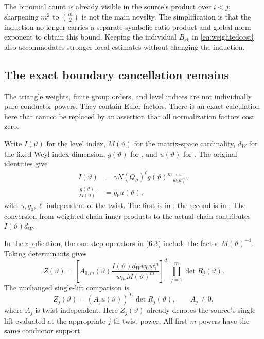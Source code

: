 The binomial count is already visible in the source's product over \(i<j\);
sharpening \(m^2\) to \(\binom m2\) is not the main novelty.
The simplification is that the induction no longer carries a separate
symbolic ratio product and global norm exponent to obtain this bound.
Keeping the individual \(B_{rk}\) in \eqref{eq:weightedcost} also
accommodates stronger local estimates without changing the induction.

\subsection{The exact boundary cancellation remains}

The triangle weights, finite group orders, and level indices are not
individually pure conductor powers. They contain Euler factors.
There is an exact calculation here that cannot be replaced by an assertion
that all normalization factors cost zero.

Write \(I(\vartheta)\) for the level index, \(M(\vartheta)\) for the
matrix-space cardinality, \(d_W\) for the fixed Weyl-index dimension,
\(g(\vartheta)\) for , and
\(u(\vartheta)\) for .
The original identities give
\begin{align}
 I(\vartheta)&=
  \gamma N(Q_\vartheta)^\ell g(\vartheta)^m
      \frac{w_m}{w_0w_1^m}, \label{eq:boundaryI}\\
 \frac{g(\vartheta)}{M(\vartheta)}&=g_0u(\vartheta),
 \label{eq:boundaryg}
\end{align}
with \(\gamma,g_0,\ell\) independent of the twist.
The first is  in
; the second is
 in
.
The conversion from weighted-chain inner products to the actual chain
contributes \(I(\vartheta)d_W\).

In the application, the one-step operators in (6.3) include the factor
\(M(\vartheta)^{-1}\). Taking determinants gives
\begin{equation}
 Z(\vartheta)=
 \left[
 A_{0,m}(\vartheta)
 \frac{I(\vartheta)d_Ww_0w_1^m}
      {w_mM(\vartheta)^m}
 \right]^{d_T}
 \prod_{j=1}^m\det R_j(\vartheta).
 \label{eq:rawZ}
\end{equation}
The unchanged single-lift comparison is
\begin{equation}
 Z_j(\vartheta)=
   (A_j u(\vartheta))^{d_T}\det R_j(\vartheta),
 \qquad A_j\ne0,
\end{equation}
where \(A_j\) is twist-independent. Here \(Z_j(\vartheta)\) already denotes
the source's single lift evaluated at the appropriate \(j\)-th twist power.
All first \(m\) powers have the same conductor support.

